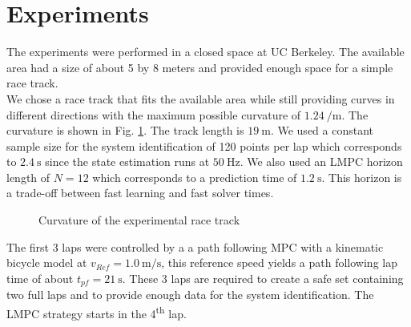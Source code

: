 \section{Experiments}
The experiments were performed in a closed space at UC Berkeley. The available area had a size of about 5 by 8 meters and provided enough space for a simple race track.\\
We chose a race track that fits the available area while still providing curves in different directions with the maximum possible curvature of $\SI{1.24}{\per\meter}$. The curvature is shown in Fig. \ref{fig:exp_curv}. The track length is $\SI{19}{\meter}$.
We used a constant sample size for the system identification of 120 points per lap which corresponds to $\SI{2.4}{\second}$ since the state estimation runs at $\SI{50}{\hertz}$. We also used an LMPC horizon length of $N=12$ which corresponds to a prediction time of $\SI{1.2}{\second}$. This horizon is a trade-off between fast learning and fast solver times.
\begin{figure}[ht]
    \centering
      
    \caption{Curvature of the experimental race track}
    \label{fig:exp_curv}
\end{figure}
The first 3 laps were controlled by a a path following MPC with a kinematic bicycle model at $v_{Ref}=\SI{1.0}{\meter\per\second}$, this reference speed yields a path following lap time of about $t_{pf}=\SI{21}{\second}$. These 3 laps are required to create a safe set containing two full laps and to provide enough data for the system identification. The LMPC strategy starts in the 4\textsuperscript{th} lap.

